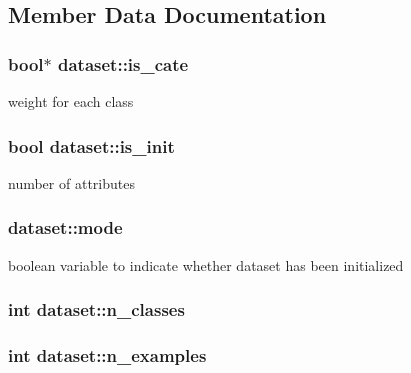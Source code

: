 \subsection{Member Data Documentation}
\hypertarget{classdataset_ab856d84d4bced1ccde106badfab229d8}{
\subsubsection[{is\+\_\+cate}]{\setlength{\rightskip}{0pt plus 5cm}bool$\ast$ dataset\+::is\+\_\+cate}}\label{classdataset_ab856d84d4bced1ccde106badfab229d8}
weight for each class \hypertarget{classdataset_ab5381427833c91ee35913ca1c1d4e73b}{
\subsubsection[{is\+\_\+init}]{\setlength{\rightskip}{0pt plus 5cm}bool dataset\+::is\+\_\+init\hspace{0.3cm}{\ttfamily [private]}}}\label{classdataset_ab5381427833c91ee35913ca1c1d4e73b}
number of attributes \hypertarget{classdataset_a47d44ca9cd02a4dc98ff80e0616a5aa9}{
\subsubsection[{mode}]{ dataset\+::mode\hspace{0.3cm}{\ttfamily [private]}}}\label{classdataset_a47d44ca9cd02a4dc98ff80e0616a5aa9}
boolean variable to indicate whether dataset has been initialized \hypertarget{classdataset_aa33a77fd21cbed4019bfb5ed82e30c6b}{
\subsubsection[{n\+\_\+classes}]{\setlength{\rightskip}{0pt plus 5cm}int dataset\+::n\+\_\+classes\hspace{0.3cm}{\ttfamily [private]}}}\label{classdataset_aa33a77fd21cbed4019bfb5ed82e30c6b}
\hypertarget{classdataset_ad7186a7fc9e74633c3b3fcddcf241ad4}{
\subsubsection[{n\+\_\+examples}]{\setlength{\rightskip}{0pt plus 5cm}int dataset\+::n\+\_\+examples\hspace{0.3cm}{\ttfamily [private]}}}\label{classdataset_ad7186a7fc9e74633c3b3fcddcf241ad4}
